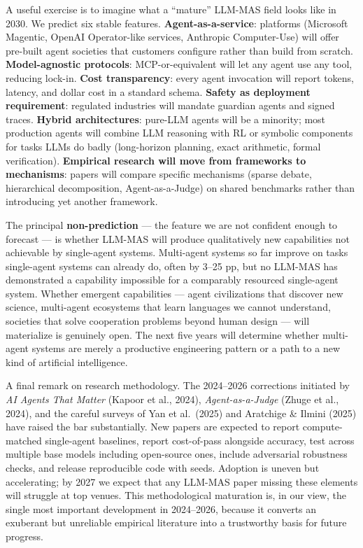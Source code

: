 A useful exercise is to imagine what a ``mature'' LLM-MAS field looks like in 2030. We predict six stable features. \textbf{Agent-as-a-service}: platforms (Microsoft Magentic, OpenAI Operator-like services, Anthropic Computer-Use) will offer pre-built agent societies that customers configure rather than build from scratch. \textbf{Model-agnostic protocols}: MCP-or-equivalent will let any agent use any tool, reducing lock-in. \textbf{Cost transparency}: every agent invocation will report tokens, latency, and dollar cost in a standard schema. \textbf{Safety as deployment requirement}: regulated industries will mandate guardian agents and signed traces. \textbf{Hybrid architectures}: pure-LLM agents will be a minority; most production agents will combine LLM reasoning with RL or symbolic components for tasks LLMs do badly (long-horizon planning, exact arithmetic, formal verification). \textbf{Empirical research will move from frameworks to mechanisms}: papers will compare specific mechanisms (sparse debate, hierarchical decomposition, Agent-as-a-Judge) on shared benchmarks rather than introducing yet another framework.

The principal \textbf{non-prediction} --- the feature we are not confident enough to forecast --- is whether LLM-MAS will produce qualitatively new capabilities not achievable by single-agent systems. Multi-agent systems so far improve on tasks single-agent systems can already do, often by 3--25 pp, but no LLM-MAS has demonstrated a capability impossible for a comparably resourced single-agent system. Whether emergent capabilities --- agent civilizations that discover new science, multi-agent ecosystems that learn languages we cannot understand, societies that solve cooperation problems beyond human design --- will materialize is genuinely open. The next five years will determine whether multi-agent systems are merely a productive engineering pattern or a path to a new kind of artificial intelligence.

A final remark on research methodology. The 2024--2026 corrections initiated by \emph{AI Agents That Matter} (Kapoor et al., 2024), \emph{Agent-as-a-Judge} (Zhuge et al., 2024), and the careful surveys of Yan et al.~(2025) and Aratchige \& Ilmini (2025) have raised the bar substantially. New papers are expected to report compute-matched single-agent baselines, report cost-of-pass alongside accuracy, test across multiple base models including open-source ones, include adversarial robustness checks, and release reproducible code with seeds. Adoption is uneven but accelerating; by 2027 we expect that any LLM-MAS paper missing these elements will struggle at top venues. This methodological maturation is, in our view, the single most important development in 2024--2026, because it converts an exuberant but unreliable empirical literature into a trustworthy basis for future progress.

